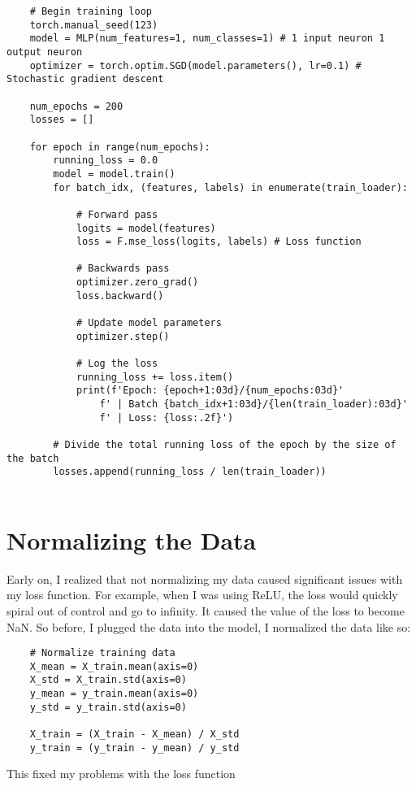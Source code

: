 \documentclass{article}
\begin{document}
\begin{lstlisting}
    # Begin training loop
    torch.manual_seed(123)
    model = MLP(num_features=1, num_classes=1) # 1 input neuron 1 output neuron
    optimizer = torch.optim.SGD(model.parameters(), lr=0.1) # Stochastic gradient descent

    num_epochs = 200
    losses = []

    for epoch in range(num_epochs):
        running_loss = 0.0
        model = model.train()
        for batch_idx, (features, labels) in enumerate(train_loader):
            
            # Forward pass
            logits = model(features)
            loss = F.mse_loss(logits, labels) # Loss function
            
            # Backwards pass
            optimizer.zero_grad()
            loss.backward()

            # Update model parameters
            optimizer.step()

            # Log the loss
            running_loss += loss.item()
            print(f'Epoch: {epoch+1:03d}/{num_epochs:03d}'
                f' | Batch {batch_idx+1:03d}/{len(train_loader):03d}'
                f' | Loss: {loss:.2f}')
        
        # Divide the total running loss of the epoch by the size of the batch
        losses.append(running_loss / len(train_loader))
        
\end{lstlisting}
\section{Normalizing the Data}
Early on, I realized that not normalizing my data caused significant issues with my loss function. For example, when I was using ReLU, the loss would quickly spiral out of control and go to infinity. It caused the value of the loss to become NaN. So before, I plugged the data into the model, I normalized the data like so:
\begin{lstlisting}
    # Normalize training data
    X_mean = X_train.mean(axis=0)
    X_std = X_train.std(axis=0)
    y_mean = y_train.mean(axis=0)
    y_std = y_train.std(axis=0)

    X_train = (X_train - X_mean) / X_std
    y_train = (y_train - y_mean) / y_std
\end{lstlisting}

This fixed my problems with the loss function
\end{document}
